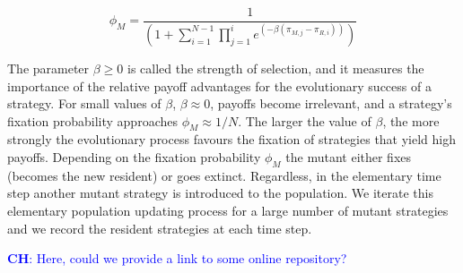 \documentclass[11pt]{article}
\newcommand{\christian}[1]{\textcolor{blue}{\textbf{CH}: #1}}
\begin{document}
\begin{equation}\label{eq:fixation_probability}
  \phi_{M} = \frac{1}{\left(1 + \displaystyle \sum_{i=1}^{N - 1} \prod_{j=1}^{i} e^{(- \beta (\pi_{M, j} - \pi_{R, i}))} \right)}
\end{equation}

The parameter \(\beta \geq 0\) is called the strength of selection, and it
measures the importance of the relative payoff advantages for the evolutionary
success of a strategy. For small values of \(\beta\), \(\beta \approx 0\),
payoffs become irrelevant, and a strategy's fixation probability approaches
\(\phi_{M} \approx 1 / N\). The larger the value of \(\beta\), the more strongly
the evolutionary process favours the fixation of strategies that yield high
payoffs.
Depending on the fixation probability \(\phi_{M}\) the mutant either fixes
(becomes the new resident) or goes extinct. Regardless, in the elementary time
step another mutant strategy is introduced to the  population. We iterate this
elementary population updating process for a large number of mutant strategies
and we record the resident strategies at each time step.

\christian{Here, could we provide a link to some online repository?} 

{\setlength{\bibsep}{0\baselineskip}


}


\clearpage
\newpage
\end{document}
